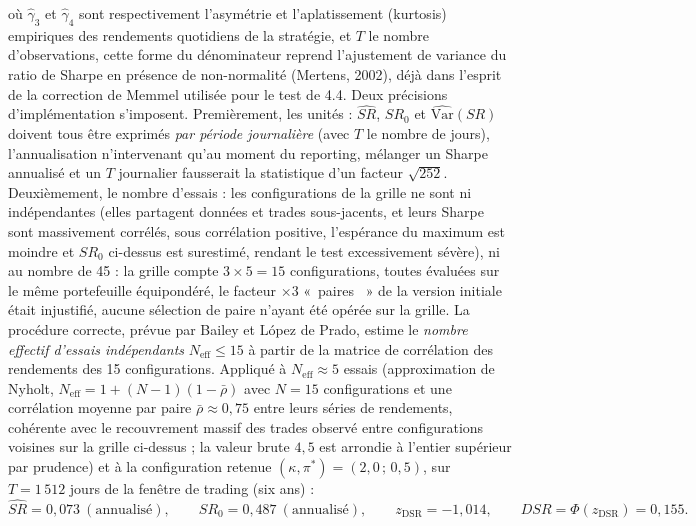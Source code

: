 \documentclass{article}
\providecommand{\og}{«~}
\providecommand{\fg}{~»}
\begin{document}
où $\hat\gamma_3$ et $\hat\gamma_4$ sont respectivement l'asymétrie et l'aplatissement (kurtosis) empiriques des rendements quotidiens de la stratégie, et $T$ le nombre d'observations, cette forme du dénominateur reprend l'ajustement de variance du ratio de Sharpe en présence de non-normalité (Mertens, 2002), déjà dans l'esprit de la correction de Memmel utilisée pour le test de 4.4. Deux précisions d'implémentation s'imposent. Premièrement, les unités : $\widehat{SR}$, $SR_0$ et $\widehat{\mathrm{Var}}(SR)$ doivent tous être exprimés \emph{par période journalière} (avec $T$ le nombre de jours), l'annualisation n'intervenant qu'au moment du reporting, mélanger un Sharpe annualisé et un $T$ journalier fausserait la statistique d'un facteur $\sqrt{252}$. Deuxièmement, le nombre d'essais : les configurations de la grille ne sont ni indépendantes (elles partagent données et trades sous-jacents, et leurs Sharpe sont massivement corrélés, sous corrélation positive, l'espérance du maximum est moindre et $SR_0$ ci-dessus est surestimé, rendant le test excessivement sévère), ni au nombre de 45 : la grille compte $3\times 5=15$ configurations, toutes évaluées sur le même portefeuille équipondéré, le facteur $\times 3$ \og paires \fg{} de la version initiale était injustifié, aucune sélection de paire n'ayant été opérée sur la grille. La procédure correcte, prévue par Bailey et López de Prado, estime le \emph{nombre effectif d'essais indépendants} $N_{\text{eff}}\leq 15$ à partir de la matrice de corrélation des rendements des 15 configurations.
Appliqué à $N_{\text{eff}}\approx 5$ essais (approximation de Nyholt, $N_{\text{eff}}=1+(N-1)(1-\bar\rho)$ avec $N=15$ configurations et une corrélation moyenne par paire $\bar\rho\approx 0{,}75$ entre leurs séries de rendements, cohérente avec le recouvrement massif des trades observé entre configurations voisines sur la grille ci-dessus ; la valeur brute $4{,}5$ est arrondie à l'entier supérieur par prudence) et à la configuration retenue $(\kappa,\pi^\ast)=(2{,}0\,;\,0{,}5)$, sur $T=1\,512$ jours de la fenêtre de trading (six ans) :
$$
\widehat{SR}=0{,}073 \ (\text{annualisé}), \qquad SR_0 = 0{,}487 \ (\text{annualisé}), \qquad z_{\text{DSR}}=-1{,}014, \qquad DSR=\Phi(z_{\text{DSR}})=0{,}155.
$$
\end{document}
